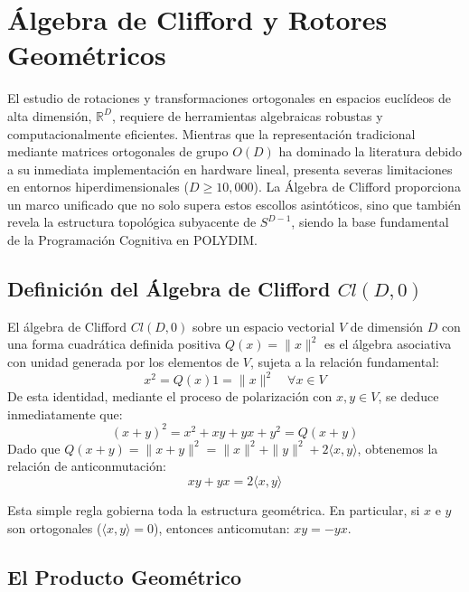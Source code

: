 \chapter{Álgebra de Clifford y Rotores Geométricos}


El estudio de rotaciones y transformaciones ortogonales en espacios euclídeos de alta dimensión, $\mathbb{R}^D$, requiere de herramientas algebraicas robustas y computacionalmente eficientes. Mientras que la representación tradicional mediante matrices ortogonales de grupo $O(D)$ ha dominado la literatura debido a su inmediata implementación en hardware lineal, presenta severas limitaciones en entornos hiperdimensionales ($D \ge 10,000$). La Álgebra de Clifford proporciona un marco unificado que no solo supera estos escollos asintóticos, sino que también revela la estructura topológica subyacente de $S^{D-1}$, siendo la base fundamental de la Programación Cognitiva en POLYDIM.

\section{Definición del Álgebra de Clifford $Cl(D,0)$}

El álgebra de Clifford $Cl(D,0)$ sobre un espacio vectorial $V$ de dimensión $D$ con una forma cuadrática definida positiva $Q(x) = \|x\|^2$ es el álgebra asociativa con unidad generada por los elementos de $V$, sujeta a la relación fundamental:
\begin{equation}
    x^2 = Q(x)1 = \|x\|^2 \quad \forall x \in V
\end{equation}
De esta identidad, mediante el proceso de polarización con $x, y \in V$, se deduce inmediatamente que:
\begin{equation}
    (x+y)^2 = x^2 + xy + yx + y^2 = Q(x+y)
\end{equation}
Dado que $Q(x+y) = \|x+y\|^2 = \|x\|^2 + \|y\|^2 + 2\langle x, y \rangle$, obtenemos la relación de anticonmutación:
\begin{equation}
    xy + yx = 2\langle x, y \rangle
\end{equation}

Esta simple regla gobierna toda la estructura geométrica. En particular, si $x$ e $y$ son ortogonales ($\langle x, y \rangle = 0$), entonces anticomutan: $xy = -yx$.

\section{El Producto Geométrico}

